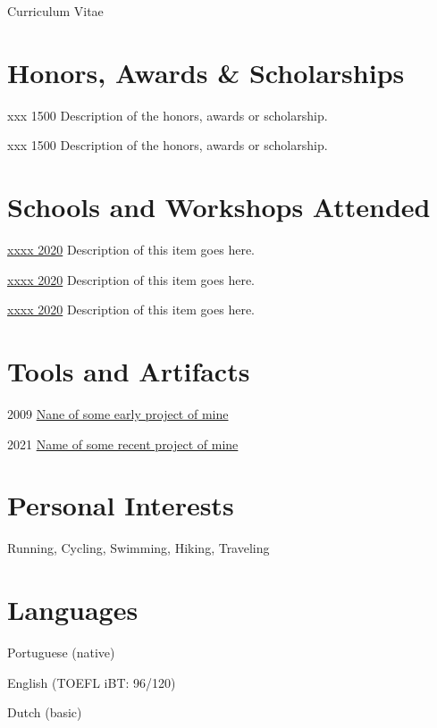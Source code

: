 \documentclass[11pt,a4paper]{article}
\begin{document}
\begin{cv}{Curriculum Vitae}
\section{Honors, Awards \& Scholarships}
\begin{cvlist}{}
  \item[xxx 1500] Description of the honors, awards or scholarship.
  \item[xxx 1500] Description of the honors, awards or scholarship.
\end{cvlist}

\section{Schools and Workshops Attended}
\begin{cvlist}{}
    \item[\href{about:blank}{xxxx 2020}] Description of this item goes here.
    \item[\href{about:blank}{xxxx 2020}] Description of this item goes here.
    \item[\href{about:blank}{xxxx 2020}] Description of this item goes here.
\end{cvlist}

\section{Tools and Artifacts}
\begin{cvlist}{}
    \item [2009] \href{https://web.archive.org/web/20131112230241/http\%3A\%2F\%2Fslackware.it\%2Fpb\%2Fplugin.php}{Nane of some early project of mine}
    \item [2021] \href{https://xxxxxxxxxxxxx.github.io}{Name of some recent project of mine}
\end{cvlist}

\section{Personal Interests}
\begin{cvlist}{}
    \item Running, Cycling, Swimming, Hiking, Traveling
\end{cvlist}

\section{Languages}
\begin{cvlist}{}
  \item Portuguese (native)
  \item English (TOEFL iBT: 96/120)
  \item Dutch (basic)
\end{cvlist}


\end{cv}
\end{document}
